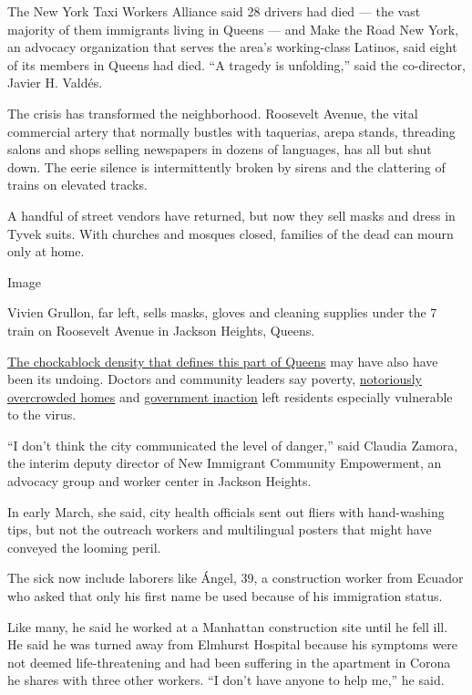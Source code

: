 The New York Taxi Workers Alliance said 28 drivers had died --- the vast
majority of them immigrants living in Queens --- and Make the Road New
York, an advocacy organization that serves the area's working-class
Latinos, said eight of its members in Queens had died. ``A tragedy is
unfolding,'' said the co-director, Javier H. Valdés.

The crisis has transformed the neighborhood. Roosevelt Avenue, the vital
commercial artery that normally bustles with taquerias, arepa stands,
threading salons and shops selling newspapers in dozens of languages,
has all but shut down. The eerie silence is intermittently broken by
sirens and the clattering of trains on elevated tracks.

A handful of street vendors have returned, but now they sell masks and
dress in Tyvek suits. With churches and mosques closed, families of the
dead can mourn only at home.

Image

Vivien Grullon, far left, sells masks, gloves and cleaning supplies
under the 7 train on Roosevelt Avenue in Jackson Heights, Queens.

\href{https://www.nytimes3xbfgragh.onion/2020/03/23/nyregion/coronavirus-nyc-crowds-density.html}{The
chockablock density that defines this part of Queens} may have also have
been its undoing. Doctors and community leaders say poverty,
\href{https://www.nytimes3xbfgragh.onion/interactive/2019/10/23/nyregion/basements-queens-immigrants.html}{notoriously
overcrowded homes} and
\href{https://www.nytimes3xbfgragh.onion/2020/04/08/nyregion/new-york-coronavirus-response-delays.html?}{government
inaction} left residents especially vulnerable to the virus.

``I don't think the city communicated the level of danger,'' said
Claudia Zamora, the interim deputy director of New Immigrant Community
Empowerment, an advocacy group and worker center in Jackson Heights.

In early March, she said, city health officials sent out fliers with
hand-washing tips, but not the outreach workers and multilingual posters
that might have conveyed the looming peril.

The sick now include laborers like Ángel, 39, a construction worker from
Ecuador who asked that only his first name be used because of his
immigration status.

Like many, he said he worked at a Manhattan construction site until he
fell ill. He said he was turned away from Elmhurst Hospital because his
symptoms were not deemed life-threatening and had been suffering in the
apartment in Corona he shares with three other workers. ``I don't have
anyone to help me,'' he said.


